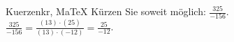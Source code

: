 \begin{MAufgabe}{Kuerzen}{kr, MaTeX}
K\"urzen Sie soweit m\"oglich: $\frac{325}{-156}$.\\ 
\ifLsg\MLoesung
\quad $\frac{325}{-156}=\frac{(13)\cdot(25)}{(13)\cdot(-12)}=\frac{25}{-12}$.\else\relax\fi
 \end{MAufgabe}